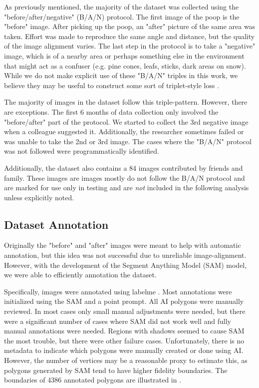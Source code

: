 \documentclass[10pt,twocolumn,letterpaper]{article}
\begin{document}
As previously mentioned, the majority of the dataset was collected using the
"before/after/negative" (B/A/N) protocol. The first image of the poop is the
"before" image. After picking up the poop, an "after" picture of the same area
was taken. Effort was made to reproduce the same angle and distance, but the
quality of the image alignment varies. The last step in the protocol is to take
a "negative" image, which is of a nearby area or perhaps something else in the
environment that might act as a confuser (e.g. pine cones, leafs, sticks, dark
areas on snow). While we do not make explicit use of these "B/A/N" triples in
this work, we believe they may be useful to construct some sort of
triplet-style loss \cite{schroff_facenet_2015}.

The majority of images in the dataset follow this triple-pattern.  However,
there are exceptions.  The first 6 months of data collection only involved the
"before/after" part of the protocol.  We started to collect the 3rd negative
image when a colleague suggested it.  Additionally, the researcher sometimes
failed or was unable to take the 2nd or 3rd image. The cases where the "B/A/N"
protocol was not followed were programmatically identified.

Additionally, the dataset also contains a 84 images contributed by friends and
family. These images are images mostly do not follow the B/A/N protocol and are
marked for use only in testing and are \emph{not} included in the following
analysis unless explicitly noted.


\subsection{Dataset Annotation}

Originally the "before" and "after" images were meant to help with automatic
annotation, but this idea was not successful due to unreliable image-alignment.
However, with the development of the Segment Anything Model (SAM)
\cite{kirillov_segment_2023} model, we were able to efficiently annotation the
dataset. 

Specifically, images were annotated using labelme \cite{wada_labelmeailabelme_nodate}. 
Most annotations were initialized using the SAM and a point prompt. 
All AI polygons were manually reviewed. In most cases only small manual
adjustments were needed, but there were a significant number of cases where SAM
did not work well and fully manual annotations were needed.
Regions with shadows seemed to cause SAM the most trouble, but there were other
failure cases. Unfortunately, there is no metadata to indicate which polygons
were manually created or done using AI.  However, the number of vertices may be
a reasonable proxy to estimate this, as polygons generated by SAM tend to have
higher fidelity boundaries.  The boundaries of 4386 annotated polygons are
illustrated in .
\end{document}
